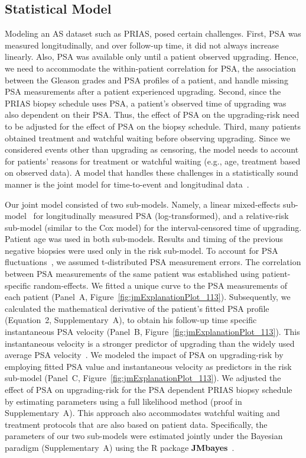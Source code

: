 \subsection{Statistical Model}
Modeling an AS dataset such as PRIAS, posed certain challenges. First, PSA was measured longitudinally, and over follow-up time, it did not always increase linearly. Also, PSA was available only until a patient observed upgrading. Hence, we need to accommodate the within-patient correlation for PSA, the association between the Gleason grades and PSA profiles of a patient, and handle missing PSA measurements after a patient experienced upgrading. Second, since the PRIAS biopsy schedule uses PSA, a patient's observed time of upgrading was also dependent on their PSA. Thus, the effect of PSA on the upgrading-risk need to be adjusted for the effect of PSA on the biopsy schedule. Third, many patients obtained treatment and watchful waiting before observing upgrading. Since we considered events other than upgrading as censoring, the model needs to account for patients' reasons for treatment or watchful waiting (e.g., age, treatment based on observed data). A model that handles these challenges in a statistically sound manner is the joint model for time-to-event and longitudinal data~\citep{tomer2019,coley2017prediction,rizopoulos2012joint}. 

Our joint model consisted of two sub-models. Namely, a linear mixed-effects sub-model~\citep{laird1982random} for longitudinally measured PSA (log-transformed), and a relative-risk sub-model (similar to the Cox model) for the interval-censored time of upgrading. Patient age was used in both sub-models. Results and timing of the previous negative biopsies were used only in the risk sub-model. To account for PSA fluctuations~\citep{nixon1997biological}, we assumed t-distributed PSA measurement errors. The correlation between PSA measurements of the same patient was established using patient-specific random-effects. We fitted a unique curve to the PSA measurements of each patient (Panel~A, Figure~\ref{fig:jmExplanationPlot_113}). Subsequently, we calculated the mathematical derivative of the patient's fitted PSA profile (Equation~2, Supplementary~A), to obtain his follow-up time specific instantaneous PSA velocity (Panel~B, Figure~\ref{fig:jmExplanationPlot_113}). This instantaneous velocity is a stronger predictor of upgrading than the widely used average PSA velocity~\citep{cooperberg2018refined}. We modeled the impact of PSA on upgrading-risk by employing fitted PSA value and instantaneous velocity as predictors in the risk sub-model (Panel~C, Figure~\ref{fig:jmExplanationPlot_113}). We adjusted the effect of PSA on upgrading-risk for the PSA dependent PRIAS biopsy schedule by estimating parameters using a full likelihood method (proof in Supplementary~A). This approach also accommodates watchful waiting and treatment protocols that are also based on patient data. Specifically, the parameters of our two sub-models were estimated jointly under the Bayesian paradigm (Supplementary~A) using the R package \textbf{JMbayes}~\citep{rizopoulosJMbayes}.

